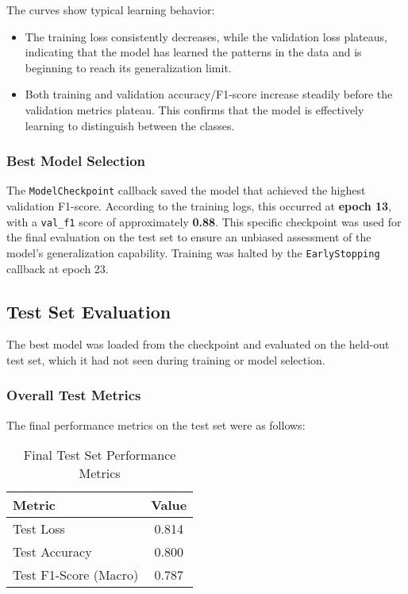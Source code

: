 \documentclass[11pt, a4paper]{article}
\begin{document}
The curves show typical learning behavior:
\begin{itemize}
    \item The training loss consistently decreases, while the validation loss plateaus, indicating that the model has learned the patterns in the data and is beginning to reach its generalization limit.
    \item Both training and validation accuracy/F1-score increase steadily before the validation metrics plateau. This confirms that the model is effectively learning to distinguish between the classes.
\end{itemize}

\subsubsection{Best Model Selection}
The \texttt{ModelCheckpoint} callback saved the model that achieved the highest validation F1-score. According to the training logs, this occurred at \textbf{epoch 13}, with a \texttt{val\_f1} score of approximately \textbf{0.88}. This specific checkpoint was used for the final evaluation on the test set to ensure an unbiased assessment of the model's generalization capability. Training was halted by the \texttt{EarlyStopping} callback at epoch 23.

\subsection{Test Set Evaluation}
The best model was loaded from the checkpoint and evaluated on the held-out test set, which it had not seen during training or model selection.

\subsubsection{Overall Test Metrics}
The final performance metrics on the test set were as follows:
\begin{table}[H]
    \centering
    \caption{Final Test Set Performance Metrics}
    \label{tab:test_metrics}
    \begin{tabular}{@{}lc@{}}
        \toprule
        \textbf{Metric} & \textbf{Value} \\ \midrule
        Test Loss & 0.814 \\
        Test Accuracy & 0.800 \\
        Test F1-Score (Macro) & 0.787 \\ \bottomrule
    \end{tabular}
\end{table}
\end{document}
